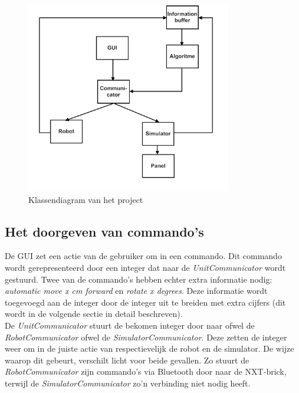 \documentclass[tt3]{penoverslag}
\begin{document}
\begin{figure}[tbp]
\begin{center}
    \includegraphics[width=0.8\textwidth]{Klassendiagram}
    \caption{Klassendiagram van het project}
    \label{fig:klasDia}
\end{center}
\end{figure}


\subsection{Het doorgeven van commando's} %
\label{ssec:commands}
De GUI zet een actie van de gebruiker om in een commando. Dit commando wordt gerepresenteerd door een integer dat naar de \textit{UnitCommunicator} wordt gestuurd. Twee van de commando's hebben echter extra informatie nodig: \textit{automatic move x cm forward} en \textit{rotate x degrees}. Deze informatie wordt toegevoegd aan de integer door de integer uit te breiden met extra cijfers (dit wordt in de volgende sectie in detail beschreven).\\
De \textit{UnitCommunicator} stuurt de bekomen integer door naar ofwel de \textit{RobotCommunicator} ofwel de \textit{SimulatorCommunicator}. Deze zetten de integer weer om in de juiste actie van respectievelijk de robot en de simulator. De wijze waarop dit gebeurt, verschilt licht voor beide gevallen. Zo stuurt de \textit{RobotCommunicator} zijn commando's via Bluetooth door naar de NXT-brick, terwijl de \textit{SimulatorCommunicator} zo'n verbinding niet nodig heeft.\\
\end{document}
